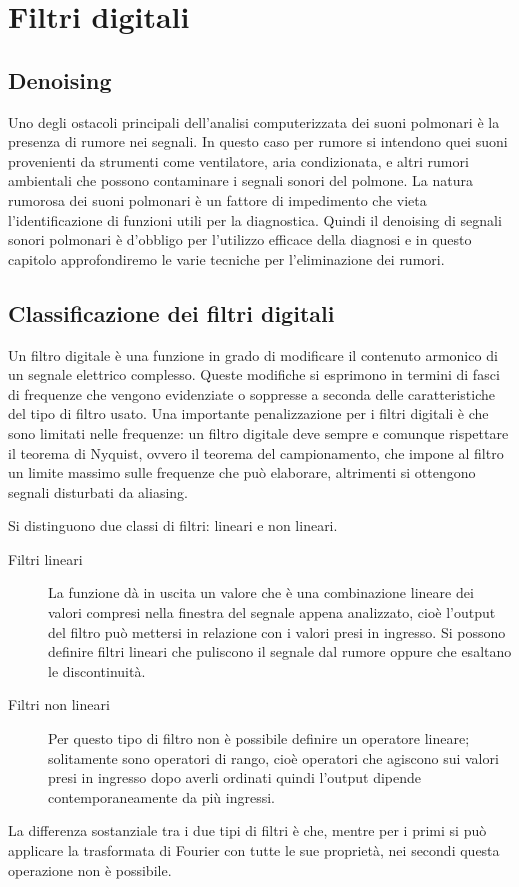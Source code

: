 \chapter{Filtri digitali}


\section{Denoising}

Uno degli ostacoli principali dell'analisi computerizzata dei suoni polmonari \`e la presenza di rumore nei segnali. 
In questo caso per rumore si intendono quei suoni provenienti da strumenti come ventilatore, aria condizionata, e altri rumori ambientali che possono contaminare i segnali sonori del polmone. 
La natura rumorosa dei suoni polmonari \`e un fattore di impedimento che vieta l'identificazione di funzioni utili per la diagnostica. 
Quindi il denoising di segnali sonori polmonari \`e d'obbligo per l'utilizzo efficace della diagnosi e in questo capitolo approfondiremo le varie tecniche per l'eliminazione dei rumori.

\section{Classificazione dei filtri digitali}

Un filtro digitale \`e una funzione in grado di modificare il contenuto armonico di un segnale elettrico complesso.
Queste modifiche si esprimono in termini di fasci di frequenze che vengono evidenziate o soppresse a seconda delle caratteristiche del tipo di filtro usato.
Una importante penalizzazione per i filtri digitali \`e che sono limitati nelle frequenze: un filtro digitale deve sempre e comunque rispettare il teorema di Nyquist, ovvero il teorema del campionamento, che impone al filtro un limite massimo sulle frequenze che pu\`o elaborare, altrimenti si ottengono segnali disturbati da aliasing.

Si distinguono due classi di filtri: lineari e non lineari.
\begin{description}
      \item[Filtri lineari]
	  La funzione d\`a in uscita un valore che \`e una combinazione lineare dei valori compresi nella finestra del segnale appena analizzato, cio\`e l'output del filtro pu\`o mettersi in relazione con i valori presi in ingresso. Si possono definire filtri lineari che puliscono il segnale dal rumore oppure che esaltano le discontinuit\`a.
      \item[Filtri non lineari]
	  Per questo tipo di filtro non \`e possibile definire un operatore lineare; solitamente sono operatori di rango, cio\`e operatori che agiscono sui valori presi in ingresso dopo averli ordinati quindi l'output dipende contemporaneamente da pi\`u ingressi.
 \end{description}
La differenza sostanziale tra i due tipi di filtri \`e che, mentre per i primi si pu\`o applicare la trasformata di Fourier con tutte le sue propriet\`a, nei secondi questa operazione non \`e possibile.

